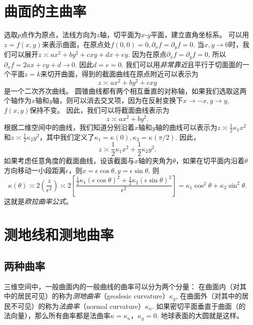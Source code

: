 \documentclass{article}
\begin{document}
\section{曲面的主曲率}

选取$p$点作为原点，法线方向为$z$轴，切平面为$x$-$y$平面，建立直角坐标系。
可以用$z=f(x,y)$来表示曲面，在原点处$f(0,0)=0, \partial_{x}f=\partial_{y}f=0$.
当$x, y\rightarrow 0$时，我们可以展开$z\asymp ax^{2}+by^{2}+cxy+dx+ey$.
因为在原点$\partial_{x}f=\partial_{y}f=0$, 所以$\partial_{x}f=2ax+cy+d\rightarrow 0$.
因此$d=e=0$.
我们可以用\emph{非常靠近}且平行于切面面的一个平面$z=k$来切开曲面，得到的截面曲线在原点附近可以表示为
\begin{equation}
    z\asymp ax^{2}+by^{2}+cxy
\end{equation}
是一个二次齐次曲线。
圆锥曲线都有两个相互垂直的对称轴，如果我们选取这两个轴作为$x$轴和$y$轴，则可以消去交叉项，因为在反射变换下$x\rightarrow -x, y\rightarrow y$, $f(x,y)$保持不变。
因此，我们可以将截面曲线表示为
\begin{equation}
    z\asymp ax^{2}+by^{2}.
\end{equation}
根据二维空间中的曲线，我们知道分别沿着$x$轴和$y$轴的曲线可以表示为$z\asymp \frac{1}{2}\kappa_{1}x^{2}$和$z\asymp \frac{1}{2}\kappa_{2}y^{2}$，其中我们定义了$\kappa_{1}=\kappa(0), \kappa_{2}=\kappa(\pi/2)$.
因此，
\begin{equation}
    z\asymp \frac{1}{2}\kappa_{1}x^{2}+\frac{1}{2}\kappa_{2}y^{2}.
\end{equation}
如果考虑任意角度的截面曲线，设该截面与$x$轴的夹角为$\theta$，如果在切平面内沿着$\theta$方向移动一小段距离$\epsilon$，则$x=\epsilon\cos\theta, y=\epsilon\sin\theta$, 则
\begin{equation}
    \kappa(\theta)
    \asymp 2\left(\frac{z}{\epsilon^{2}}\right)
    \asymp 2\left[\frac{\frac{1}{2}\kappa_{1}(\epsilon\cos\theta)^{2}+\frac{1}{2}\kappa_{2}(\epsilon\sin\theta)^{2}}{\epsilon^{2}}\right]
    =\kappa_{1}\cos^{2}\theta+\kappa_{2}\sin^{2}\theta.
\end{equation}
这就是\emph{欧拉曲率公式}。

\section{测地线和测地曲率}

\subsection{两种曲率}

三维空间中，一般曲面内的一般曲线的曲率可以分为两个分量：
在曲面内（对其中的居民可见）的称为\emph{测地曲率}（geodesic curvature）$\kappa_{g}$, 在曲面外（对其中的居民不可见）的称为\emph{法曲率}（normal curvature）$\kappa_{n}$.
如果密切平面垂直于曲面（的法向量），那么所有曲率都是法曲率$\kappa=\kappa_{n}$，$\kappa_{g}=0$.
地球表面的大圆就是这样。
\end{document}

